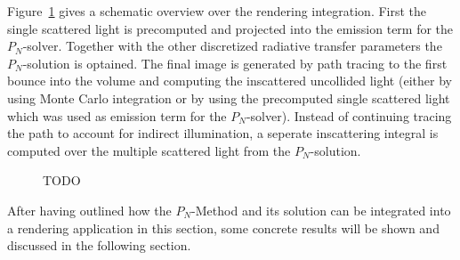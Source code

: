 Figure~\ref{fig:pn_rendering_integration_overview} gives a schematic overview over the rendering integration. First the single scattered light is precomputed and projected into the emission term for the $P_N$-solver. Together with the other discretized radiative transfer parameters the $P_N$-solution is optained. The final image is generated by path tracing to the first bounce into the volume and computing the inscattered uncollided light (either by using Monte Carlo integration or by using the precomputed single scattered light which was used as emission term for the $P_N$-solver). Instead of continuing tracing the path to account for indirect illumination, a seperate inscattering integral is computed over the multiple scattered light from the $P_N$-solution.

\begin{figure}[h]
\centering
{}
\caption{TODO}
\label{fig:pn_rendering_integration_overview}
\end{figure}

After having outlined how the $P_N$-Method and its solution can be integrated into a rendering application in this section, some concrete results will be shown and discussed in the following section.
